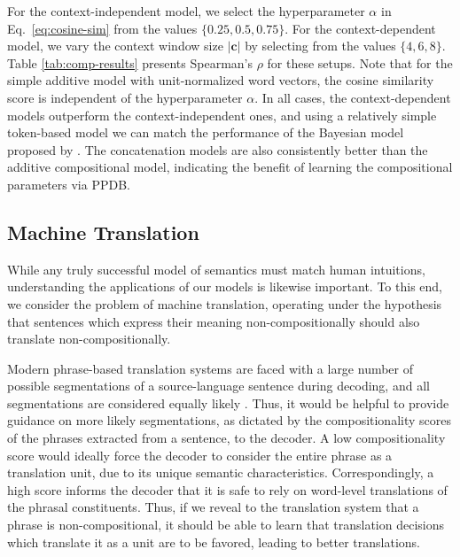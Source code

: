 \documentclass[11pt]{article}
\begin{document}
For the context-independent model, we select the hyperparameter $\alpha$ in Eq.~\ref{eq:cosine-sim} from the values $\{0.25, 0.5, 0.75\}$. 
For the context-dependent model, we vary the context window size $|\boldsymbol{c}|$ by selecting from the values $\{4, 6, 8\}$. 
Table \ref{tab:comp-results} presents Spearman's $\rho$ for these setups. 
Note that for the simple additive model with unit-normalized word vectors, the cosine similarity score is independent of the hyperparameter $\alpha$.
In all cases, the context-dependent models outperform the context-independent ones, and using a relatively simple token-based model we can match the performance of the Bayesian model proposed by .  
The concatenation models are also consistently better than the additive compositional model, indicating the benefit of learning the compositional parameters via PPDB. 

\subsection{Machine Translation}
\label{sec:mt-eval}

While any truly successful model of semantics must match human intuitions, understanding the applications of our models is likewise important. 
To this end, we consider the problem of machine translation, operating under the hypothesis that sentences which express their meaning non-compositionally should also translate non-compositionally. 

Modern phrase-based translation systems are faced with a large number of possible segmentations of a source-language sentence during decoding, and all segmentations are considered equally likely \cite{Koehn2003}.  
Thus, it would be helpful to provide guidance on more likely segmentations, as dictated by the compositionality scores of the phrases extracted from a sentence, to the decoder. 
A low compositionality score would ideally force the decoder to consider the entire phrase as a translation unit, due to its unique semantic characteristics.
Correspondingly, a high score informs the decoder that it is safe to rely on word-level translations of the phrasal constituents. 
Thus, if we reveal to the translation system that a phrase is non-compositional, it should be able to learn that translation decisions which translate it as a unit are to be favored, leading to better translations.

\end{document}
